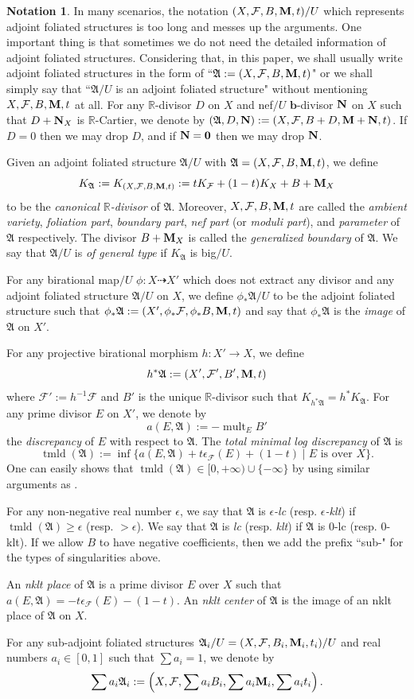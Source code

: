\documentclass[12pt]{amsart}
\numberwithin{equation}{section}
\newcommand{\bb}{\bm{b}}
\newcommand{\Mm}{{\bf{M}}}
\newcommand{\Nn}{{\bf{N}}}
\newcommand{\Rr}{\mathbb{R}}
\newcommand{\tmld}{{\operatorname{tmld}}}
\newcommand{\mult}{\operatorname{mult}}
\newcommand{\Aa}{{\mathfrak{A}}}
\newcommand{\Ff}{\mathcal{F}}
\theoremstyle{definition}
\theoremstyle{definition}
\newtheorem{nota}[thm]{Notation}
\theoremstyle{definition}
\begin{document}
\begin{nota}\label{nota: simplified notation of afs}
In many scenarios, the notation $(X,\Ff,B,\Mm,t)/U$ which represents adjoint foliated structures is too long and messes up the arguments. One important thing is that sometimes we do not need the detailed information of adjoint foliated structures. 
Considering that, in this paper, we shall usually write adjoint foliated structures in the form of ``$\Aa:=(X,\Ff,B,\Mm,t)$" or we shall simply say that ``$\Aa/U$ is an adjoint foliated structure" without mentioning $X,\Ff,B,\Mm,t$ at all.  
For any $\Rr$-divisor $D$ on $X$ and nef$/U$ $\bb$-divisor $\Nn$ on $X$ such that $D+\Nn_X$ is $\Rr$-Cartier, we denote by $(\Aa,D,\Nn):=(X,\Ff,B+D,\Mm+\Nn,t)$. If $D=0$ then we may drop $D$, and if $\Nn=\bm{0}$ then we may drop $\Nn$.

Given an adjoint foliated structure $\Aa/U$ with $\Aa=(X,\Ff,B,\Mm,t)$, we define
$$K_{\Aa}:=K_{(X,\Ff,B,\Mm,t)}:=tK_{\Ff}+(1-t)K_X+B+\Mm_X$$
to be the \emph{canonical $\Rr$-divisor} of $\Aa$. 
Moreover, 
$X,\Ff,B,\Mm,t$ are called the \emph{ambient variety}, \emph{foliation part}, \emph{boundary part}, \emph{nef part} (or \emph{moduli part}), and \emph{parameter} of $\Aa$ respectively. 
The divisor
$B+\Mm_X$ is called the \emph{generalized boundary} of $\Aa$. We say that $\Aa/U$ is \emph{of general type} if $K_{\Aa}$ is big$/U$. 

For any birational map$/U$ $\phi: X\dashrightarrow X'$ which does not extract any divisor and any adjoint foliated structure $\Aa/U$ on $X$, we define $\phi_*\Aa/U$ to be the adjoint foliated structure such that $\phi_*\Aa:=(X',\phi_*\Ff,\phi_*B,\Mm,t)$ and say that $\phi_*\Aa$ is the \emph{image} of $\Aa$ on $X'$. 

For any projective birational morphism $h: X'\rightarrow X$, we define 
$$h^*\Aa:=(X',\Ff',B',\Mm,t)$$
where $\Ff':=h^{-1}\Ff$ and $B'$ is the unique $\Rr$-divisor such that $K_{h^*\Aa}=h^*K_{\Aa}$. For any prime divisor $E$ on $X'$, we denote by
$$a(E,\Aa):=-\mult_EB'$$
the \emph{discrepancy} of $E$ with respect to $\Aa$. The \emph{total minimal log discrepancy} of $\Aa$ is
$$\tmld(\Aa):=\inf\{a(E,\Aa)+t\epsilon_{\Ff}(E)+(1-t)\mid E\text{ is over }X\}.$$
One can easily shows that $\tmld(\Aa)\in [0,+\infty)\cup\{-\infty\}$ by using similar arguments as \cite[Remark 2.3]{CS21}.


For any non-negative real number $\epsilon$, we say that $\Aa$ is \emph{$\epsilon$-lc} (resp. \emph{$\epsilon$-klt}) if $\tmld(\Aa)\geq\epsilon$ (resp. $>\epsilon$). We say that $\Aa$ is \emph{lc} (resp. \emph{klt}) if $\Aa$ is $0$-lc (resp. $0$-klt). If we allow $B$ to have negative coefficients, then we add the prefix ``sub-" for the types of singularities above.


An \emph{nklt place} of $\Aa$ is a prime divisor $E$ over $X$ such that $a(E,\Aa)=-t\epsilon_{\Ff}(E)-(1-t)$. An \emph{nklt center} of $\Aa$ is the image of an nklt place of $\Aa$ on $X$.

For any sub-adjoint foliated structures $\Aa_i/U=(X,\Ff,B_i,\Mm_i,t_i)/U$ and real numbers $a_i\in [0,1]$ such that $\sum a_i=1$, we denote by
$$\sum a_i\Aa_i:=\left(X,\Ff,\sum a_iB_i,\sum a_i\Mm_i,\sum a_it_i\right).$$
\end{nota}
\end{document}
